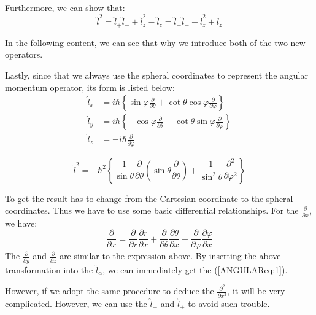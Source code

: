 Furthermore, we can show that:
\begin{equation}\label{ANGULAReq:3}
\hat{l}^{2} = \hat{l}_{+}\hat{l}_{-} + \hat{l}^{2}_{z} - \hat{l}_{z}
=\hat{l}_{-}\hat{l}_{+} + \hat{l}^{2}_{z} + \hat{l}_{z}
\end{equation}

In the following content, we can see that why we introduce both of
the two new operators.

Lastly, since that we always use the spheral coordinates to
represent the angular momentum operator, its form is listed below:
\begin{align}\label{ANGULAReq:1}
\hat{l}_{x} &=i\hbar\left\{\sin\varphi \frac{\partial}{\partial
\theta} + \cot\theta\cos\varphi \frac{\partial}{\partial\varphi} \right\}       \nonumber \\
\hat{l}_{y} &=i\hbar\left\{-\cos\varphi \frac{\partial}{\partial
\theta} + \cot\theta\sin\varphi \frac{\partial}{\partial\varphi}
\right\} \nonumber \\
\hat{l}_{z} &= -i\hbar
\frac{\partial}{\partial\varphi}
\end{align}

\begin{equation}\label{ANGULAReq:2}
\hat{l}^{2}
=-\hbar^{2}\left\{\frac{1}{\sin\theta}\frac{\partial}{\partial\theta}
\left(\sin\theta\frac{\partial}{\partial\theta}\right)
+\frac{1}{\sin^{2}\theta}\frac{\partial^{2}}{\partial\varphi^{2}}
\right\}
\end{equation}

To get the result has to change from the Cartesian coordinate to the
spheral coordinates. Thus we have to use some basic differential
relationships. For the $\frac{\partial}{\partial x}$, we have:
\begin{equation}\label{}
\frac{\partial}{\partial x} = \frac{\partial}{\partial
r}\frac{\partial r}{\partial x} +
\frac{\partial}{\partial\theta}\frac{\partial\theta}{\partial x} +
\frac{\partial}{\partial\varphi}\frac{\partial\varphi}{\partial x}
\end{equation}
The $\frac{\partial}{\partial y}$ and $\frac{\partial}{\partial z}$
are similar to the expression above. By inserting the above
transformation into the $\hat{l}_{\alpha}$, we can immediately get
the (\ref{ANGULAReq:1}).

However, if we adopt the same procedure to deduce the
$\frac{\partial^{2}}{\partial x^{2}}$, it will be very complicated.
However, we can use the $\hat{l}_{+}$ and $\hat{l}_{+}$ to avoid
such trouble.

